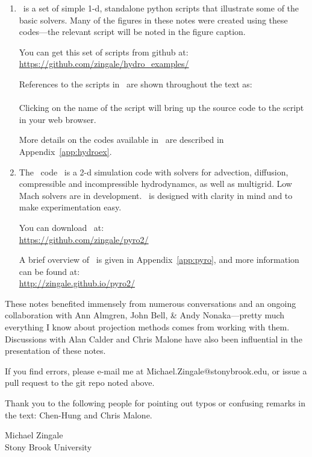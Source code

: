\begin{enumerate}
\item \hydroex\ is a set of simple 1-d, standalone python scripts
  that illustrate some of the basic solvers.  Many of the figures
  in these notes were created using these codes---the relevant
  script will be noted in the figure caption.  

  You can get this set of scripts from github at:\\
  \url{https://github.com/zingale/hydro_examples/}

  References to the scripts in \hydroex\ are shown throughout
  the text as: \\[0.5em]
   \\[0.5em]
  Clicking on the name of the script will bring up the source code
  to the script in your web browser.

  More details on the codes available in \hydroex\ are described
  in Appendix~\ref{app:hydroex}.

\item  
  The \pyro\ code~\cite{pyro} is a 2-d simulation code with
  solvers for advection, diffusion, compressible and incompressible
  hydrodynamcs, as well as multigrid.  Low Mach solvers are 
  in development.  \pyro\ is designed with clarity in mind and to make 
  experimentation easy.  

  You can download \pyro\ at: \\
  \url{https://github.com/zingale/pyro2/} 

  A brief overview of \pyro\ is given in Appendix~\ref{app:pyro},
  and more information can be found at: \\
\url{http://zingale.github.io/pyro2/}
\end{enumerate}

These notes benefited immensely from numerous conversations and an ongoing
collaboration with Ann Almgren, John Bell, \& Andy Nonaka---pretty much
everything I know about projection methods comes from working with them.
Discussions with Alan Calder and Chris Malone have also been influential
in the presentation of these notes.

If you find errors, please e-mail me at Michael.Zingale@stonybrook.edu,
or issue a pull request to the git repo noted above.  

Thank you to the
following people for pointing out typos or confusing remarks in the text:
Chen-Hung and Chris Malone.


\begin{flushright}
Michael Zingale \\
Stony Brook University
\end{flushright}
